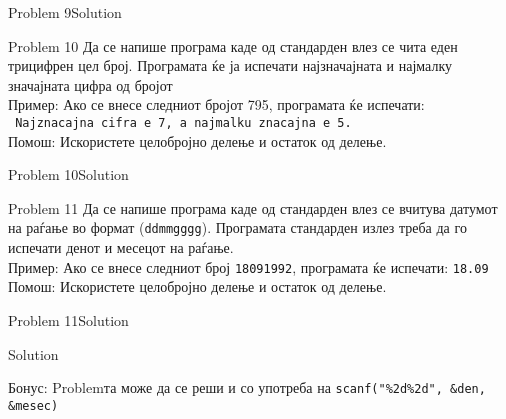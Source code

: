 \begin{frame}[fragile]{Problem 9}{Solution}
	
\end{frame}


\begin{frame}[fragile]{Problem 10}
Да се напише програма каде од стандарден влез се чита еден трицифрен цел број.
Програмата ќе ја испечати најзначајната и најмалку значајната цифра од бројот\\ 
Пример: Ако се внесе следниот бројот 795, програмата ќе испечати:\\
\texttt{	Najznacajna cifra e 7, a najmalku znacajna e 5.}\\
Помош: Искористете целобројно делење и остаток од делење.
\end{frame}

\begin{frame}[fragile]{Problem 10}{Solution}

\end{frame}


\begin{frame}[fragile]{Problem 11}
Да се напише програма каде од стандарден влез се вчитува датумот на раѓање во
формат (\texttt{ddmmgggg}). Програмата стандарден излез треба да го испечати
денот и месецот на раѓање.\\ Пример: Ако се внесе следниот број
\texttt{18091992}, програмата ќе испечати: \texttt{18.09}\\ Помош: Искористете целобројно делење и остаток од делење.
\end{frame}

\begin{frame}[fragile]{Problem 11}{Solution}
	\begin{exampleblock}{Solution}
		
	\end{exampleblock}
	Бонус: Problemта може да се реши и со употреба на \texttt{scanf("\%2d\%2d", \&den, \&mesec)}
\end{frame}
